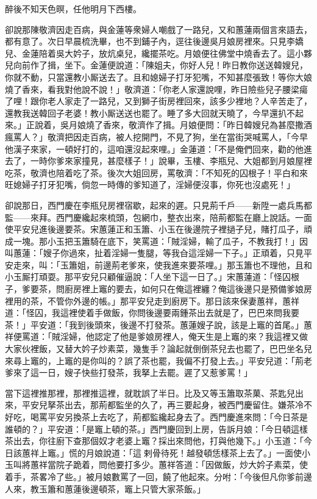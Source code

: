 \begin{myquote} 
醉後不知天色暝，任他明月下西樓。
\end{myquote} 

卻說那陳敬濟因走百病，與金蓮等衆婦人嘲戲了一路兒，又和蕙蓮兩個言來語去，都有意了。次日早晨梳洗畢，也不到鋪子內，逕往後邊吳月娘房裡來。只見李嬌兒、金蓮陪着吳大妗子，放炕桌兒，纔擺茶吃。月娘便往佛堂中燒香去了。這小夥兒向前作了揖，坐下。金蓮便說道：「陳姐夫，你好人兒！昨日教你送送韓嫂兒，你就不動，只當還教小厮送去了。且和媳婦子打牙犯嘴，不知甚麼張致！{}等你大娘燒了香來，看我對他說不說！」敬濟道：「你老人家還說哩，昨日險些兒子腰梁瘍了哩！跟你老人家走了一路兒，又到獅子街房裡回來，該多少裡地？人辛苦走了，還教我送韓回子老婆！教小厮送送也罷了。睡了多大回就天曉了，今早還扒不起來。」正說着，吳月娘燒了香來，敬濟作了揖。月娘便問：「昨日韓嫂兒為甚麼撒酒瘋罵人？」敬濟把因走百病，被人挖開門，不見了狗，坐在當街哭喊罵人，「今早他漢子來家，一頓好打的，{}這咱還沒起來哩。」金蓮道：「不是俺們回來，勸的他進去了，一時你爹來家撞見，甚麼樣子！」說畢，玉樓、李瓶兒、大姐都到月娘屋裡吃茶，敬濟也陪着吃了茶。後次大姐回房，罵敬濟：「不知死的囚根子！平白和來旺媳婦子打牙犯嘴，倘忽一時傳的爹知道了，淫婦便沒事，{}{}你死也沒處死！」

卻說那日，西門慶在李瓶兒房裡宿歇，起來的遲。只見荊千戶——新陞一處兵馬都監——來拜。西門慶纔起來梳頭，包網巾，整衣出來，陪荊都監在廳上說話。一面使平安兒進後邊要茶。宋蕙蓮正和玉簫、小玉在後邊院子裡撾子兒，賭打瓜子，頑成一塊。那小玉把玉簫騎在底下，笑罵道：「賊淫婦，輸了瓜子，不教我打！」因叫蕙蓮：「嫂子你過來，扯着淫婦一隻腿，等我㒲這淫婦一下子。」{}正頑着，只見平安走來，叫：「玉簫姐，前邊荊老爹來，使我進來要茶哩。」那玉簫也不理他，且和小玉厮打頑耍。那平安兒只顧催逼說：「人坐下這一日了。」宋蕙蓮道：「怪囚根子，爹要茶，問廚房裡上竈的要去，如何只在俺這裡纏？俺這後邊只是預備爹娘房裡用的茶，不管你外邊的帳。」那平安兒走到廚房下。那日該來保妻蕙祥，蕙祥道：「怪囚，我這裡使着手做飯，你問後邊要兩鍾茶出去就是了，巴巴來問我要茶！」平安道：「我到後頭來，後邊不打發茶。蕙蓮嫂子說，該是上竈的首尾。」蕙祥便罵道：「賊淫婦，他認定了他是爹娘房裡人，{}俺天生是上竈的來？我這裡又做大家伙裡飯，又替大妗子炒素菜，幾隻手？論起就倒倒茶兒去也罷了，巴巴坐名兒來尋上竈的，上竈的是你叫的？{}誤了茶也罷，我偏不打發上去。」平安兒道：「荊老爹來了這一日，嫂子快些打發茶，我拏上去罷。遲了又惹爹罵！」

當下這裡推那裡，那裡推這裡，就耽誤了半日。比及又等玉簫取茶菓、茶匙兒出來，平安兒拏茶出去，那荊都監坐的久了，再三要起身，被西門慶留住。嫌茶冷不好吃，喝罵平安另換茶上去吃了，荊都監纔起身去了。西門慶進來問：「今日茶是誰頓的？」平安道：「是竈上頓的茶。」西門慶回到上房，告訴月娘：「今日頓這樣茶出去，你往廚下查那個奴才老婆上竈？採出來問他，打與他幾下。」小玉道：「今日該蕙祥上竈。」慌的月娘說道：「這𢱉剌骨待死！越發頓恁樣茶上去了。」一面使小玉叫將蕙祥當院子跪着，問他要打多少。蕙祥答道：「因做飯，炒大妗子素菜，使着手，茶畧冷了些。」被月娘數罵了一回，饒了他起來。分咐：「今後但凡你爹前邊人來，教玉簫和蕙蓮後邊頓茶，竈上只管大家茶飯。」

